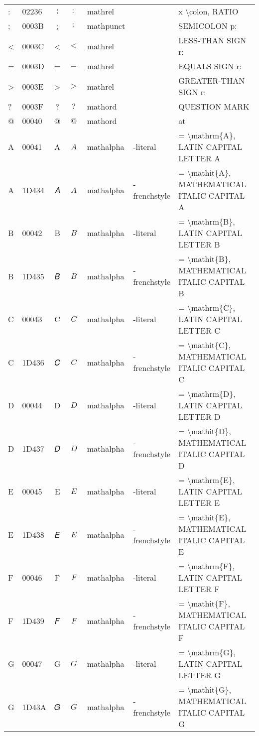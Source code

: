 \documentclass[a4paper,landscape]{article}
\begin{document}
\begin{longtable}{llcclll}
: & 02236 & ∶ & $:$ & mathrel &  & x \textbackslash{}colon, RATIO \\
; & 0003B & ; & $;$ & mathpunct &  & SEMICOLON p: \\
< & 0003C & < & $<$ & mathrel &  & LESS-THAN SIGN r: \\
= & 0003D & = & $=$ & mathrel &  & EQUALS SIGN r: \\
> & 0003E & > & $>$ & mathrel &  & GREATER-THAN SIGN r: \\
? & 0003F & ? & $?$ & mathord &  & QUESTION MARK \\
@ & 00040 & @ & $@$ & mathord &  & at \\
A & 00041 & A & $A$ & mathalpha & -literal & = \textbackslash{}mathrm\{A\}, LATIN CAPITAL LETTER A \\
A & 1D434 & 𝐴 & $A$ & mathalpha & -frenchstyle & = \textbackslash{}mathit\{A\}, MATHEMATICAL ITALIC CAPITAL A \\
B & 00042 & B & $B$ & mathalpha & -literal & = \textbackslash{}mathrm\{B\}, LATIN CAPITAL LETTER B \\
B & 1D435 & 𝐵 & $B$ & mathalpha & -frenchstyle & = \textbackslash{}mathit\{B\}, MATHEMATICAL ITALIC CAPITAL B \\
C & 00043 & C & $C$ & mathalpha & -literal & = \textbackslash{}mathrm\{C\}, LATIN CAPITAL LETTER C \\
C & 1D436 & 𝐶 & $C$ & mathalpha & -frenchstyle & = \textbackslash{}mathit\{C\}, MATHEMATICAL ITALIC CAPITAL C \\
D & 00044 & D & $D$ & mathalpha & -literal & = \textbackslash{}mathrm\{D\}, LATIN CAPITAL LETTER D \\
D & 1D437 & 𝐷 & $D$ & mathalpha & -frenchstyle & = \textbackslash{}mathit\{D\}, MATHEMATICAL ITALIC CAPITAL D \\
E & 00045 & E & $E$ & mathalpha & -literal & = \textbackslash{}mathrm\{E\}, LATIN CAPITAL LETTER E \\
E & 1D438 & 𝐸 & $E$ & mathalpha & -frenchstyle & = \textbackslash{}mathit\{E\}, MATHEMATICAL ITALIC CAPITAL E \\
F & 00046 & F & $F$ & mathalpha & -literal & = \textbackslash{}mathrm\{F\}, LATIN CAPITAL LETTER F \\
F & 1D439 & 𝐹 & $F$ & mathalpha & -frenchstyle & = \textbackslash{}mathit\{F\}, MATHEMATICAL ITALIC CAPITAL F \\
G & 00047 & G & $G$ & mathalpha & -literal & = \textbackslash{}mathrm\{G\}, LATIN CAPITAL LETTER G \\
G & 1D43A & 𝐺 & $G$ & mathalpha & -frenchstyle & = \textbackslash{}mathit\{G\}, MATHEMATICAL ITALIC CAPITAL G \\

\end{longtable}
\end{document}

